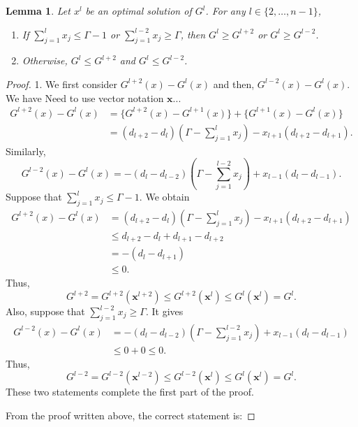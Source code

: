 \documentclass[letterpaper, 10pt]{article}
\newtheorem{lemma}{Lemma}
\newcommand{\rednote}[1]{{\Large\color{red}#1}}
\renewcommand{\vec}[1]{\bm{#1}}
\begin{document}
\begin{lemma} \label{lem:new_prop}
	Let $x^{l}$ be an optimal solution of $G^{l}$. For any $l \in \{2, \ldots, n-1 \}$,
	\begin{enumerate}
		\item If $\sum_{j=1}^{l}{x_{j}} \le \Gamma - 1$ or $\sum_{j=1}^{l-2}{x_{j}} \ge \Gamma$, then $G^{l} \ge G^{l+2}$ or $G^{l} \ge G^{l-2}$.
		\item Otherwise, $G^{l} \le G^{l+2}$ and $G^{l} \le G^{l-2}$.
	\end{enumerate}
\end{lemma}
\begin{proof}
	1. We first consider $G^{l+2}(x) - G^{l}(x)$ and then, $G^{l-2}(x) - G^{l}(x)$. We have \rednote{Need to use vector notation $\vec{x}$...}
	\begin{align*}
		G^{l+2}(x) - G^{l}(x) 
		& = \{ G^{l+2}(x) - G^{l+1}(x) \} + \{ G^{l+1}(x) - G^{l}(x) \} \\
		& = (d_{l+2} - d_{l}) \left( \Gamma - \sum\limits_{j=1}^{l}{x_{j}} \right) - x_{l+1}(d_{l+2} - d_{l+1}).
	\end{align*}
	Similarly,
	\[
		G^{l-2}(x) - G^{l}(x) = -(d_{l} - d_{l-2}) \left( \Gamma - \sum\limits_{j=1}^{l-2}{x_{j}} \right) + x_{l-1}(d_{l} - d_{l-1}).
	\]
	Suppose that $\sum_{j=1}^{l}{x_{j}} \le \Gamma - 1$. We obtain
	\begin{align*}
		G^{l+2}(x) - G^{l}(x) 
		&= (d_{l+2} - d_{l}) \left( \Gamma - \sum\limits_{j=1}^{l}{x_{j}} \right) - x_{l+1}(d_{l+2} - d_{l+1}) \\
		&\le d_{l+2} - d_{l} + d_{l+1} - d_{l+2} \\
		&= -(d_{l} - d_{l+1}) \\
		&\le 0.
	\end{align*}
	Thus,
	\[
		G^{l+2} = G^{l+2}(\vec{x}^{l+2}) \le G^{l+2}(\vec{x}^{l}) \le G^{l}(\vec{x}^{l}) = G^{l}.
	\]
	Also, suppose that $\sum_{j=1}^{l-2}{x_{j}} \ge \Gamma$. It gives
	\begin{align*}
		G^{l-2}(x) - G^{l}(x) 
		&= -(d_{l} - d_{l-2}) \left( \Gamma - \sum\limits_{j=1}^{l-2}{x_{j}} \right) + x_{l-1}(d_{l} - d_{l-1}) \\
		&\le 0+0 \le 0.
	\end{align*}
	Thus,
	\[
		G^{l-2} = G^{l-2}(\vec{x}^{l-2}) \le G^{l-2}(\vec{x}^{l}) \le G^{l}(\vec{x}^{l}) = G^{l}.
	\]
	These two statements complete the first part of the proof. 

	\rednote{
		From the proof written above, the correct statement is:
		
}
\end{proof}
\end{document}
